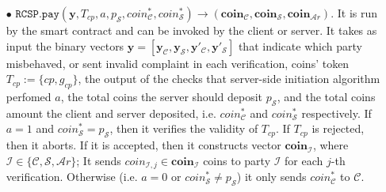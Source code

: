 \begin{definition}[RC-S-P Scheme]
\begin{itemize}
\
	
\item[$\bullet$] $\mathtt{RCSP}.\mathtt{pay}(\bm{y},T_{\scriptscriptstyle cp},a,p_{\scriptscriptstyle\mathcal S}, coin^{\scriptscriptstyle *}_{\scriptscriptstyle\mathcal C},coin^{\scriptscriptstyle *}_{\scriptscriptstyle\mathcal S})\rightarrow ({\bm{coin}}_{\scriptscriptstyle\mathcal C},{\bm{coin}}_{\scriptscriptstyle\mathcal S},{\bm{coin}}_{\scriptscriptstyle\mathcal Ar})$. It is run by the smart contract and can be invoked by the client or server. It takes as input the binary vectors $\bm{y}=[\bm{y}_{\scriptscriptstyle \mathcal  C}, \bm{y}_{\scriptscriptstyle \mathcal  S},\bm{y}'_{\scriptscriptstyle \mathcal  C}, \bm{y}'_{\scriptscriptstyle \mathcal  S}]$ that indicate which party misbehaved, or sent invalid complaint  in each verification,  coins' token $T_{\scriptscriptstyle cp}:=\{cp,g_{\scriptscriptstyle cp}\}$, the output of the checks that server-side initiation algorithm  perfomed $a$, the total coins the server should deposit $p_{\scriptscriptstyle\mathcal S}$, and the total coins amount the client and server  deposited, i.e. $coin^{\scriptscriptstyle *}_{\scriptscriptstyle\mathcal C}$ and $coin^{\scriptscriptstyle *}_{\scriptscriptstyle\mathcal S}$ respectively. If $a=1$ and  $coin^{\scriptscriptstyle *}_{\scriptscriptstyle\mathcal S}= p_{\scriptscriptstyle\mathcal S}$, then it verifies the validity of $T_{\scriptscriptstyle cp}$. If $T_{\scriptscriptstyle cp}$ is rejected, then it aborts. 
If it is accepted, then it constructs  vector ${\bm{coin}}_{\scriptscriptstyle\mathcal I}$, where $\mathcal{I}\in\{\mathcal{C},\mathcal{S},\mathcal{A}r\}$; It sends ${{coin}}_{\scriptscriptstyle\mathcal{I},j}\in{\bm{coin}}_{\scriptscriptstyle\mathcal I}$ coins to party $\mathcal{I}$ for each $j$-th verification. Otherwise (i.e. $a=0$ or $coin^{\scriptscriptstyle *}_{\scriptscriptstyle\mathcal S}\neq p_{\scriptscriptstyle\mathcal S}$)  it only sends $coin^{\scriptscriptstyle *}_{\scriptscriptstyle\mathcal C}$ to $\mathcal C$. 



\end{itemize}
\end{definition}


